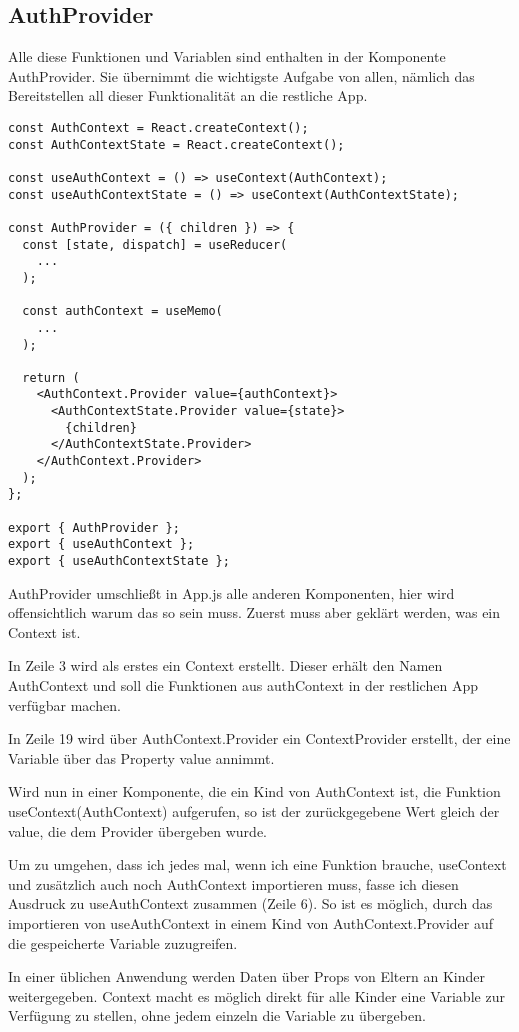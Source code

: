 \subsection{AuthProvider}
Alle diese Funktionen und Variablen sind enthalten in der Komponente AuthProvider. Sie übernimmt die
wichtigste Aufgabe von allen, nämlich das Bereitstellen all dieser Funktionalität an die restliche
App.

\begin{lstlisting}
const AuthContext = React.createContext();
const AuthContextState = React.createContext();

const useAuthContext = () => useContext(AuthContext);
const useAuthContextState = () => useContext(AuthContextState);

const AuthProvider = ({ children }) => {
  const [state, dispatch] = useReducer(
    ...
  );

  const authContext = useMemo(
    ...
  );

  return (
    <AuthContext.Provider value={authContext}>
      <AuthContextState.Provider value={state}>
        {children}
      </AuthContextState.Provider>
    </AuthContext.Provider>
  );
};

export { AuthProvider };
export { useAuthContext };
export { useAuthContextState };
\end{lstlisting}

AuthProvider umschließt in App.js alle anderen Komponenten, hier wird offensichtlich warum das so
sein muss. Zuerst muss aber geklärt werden, was ein Context ist.

In Zeile 3 wird als erstes ein Context erstellt. Dieser erhält den Namen AuthContext und soll die
Funktionen aus authContext in der restlichen App verfügbar machen.

In Zeile 19 wird über AuthContext.Provider ein ContextProvider erstellt, der eine Variable über das
Property value annimmt.

Wird nun in einer Komponente, die ein Kind von AuthContext ist, die Funktion useContext(AuthContext)
aufgerufen, so ist der zurückgegebene Wert gleich der value, die dem Provider übergeben wurde.

Um zu umgehen, dass ich jedes mal, wenn ich eine Funktion brauche, useContext und zusätzlich auch
noch AuthContext importieren muss, fasse ich diesen Ausdruck zu useAuthContext zusammen (Zeile 6).
So ist es möglich, durch das importieren von useAuthContext in einem Kind von AuthContext.Provider
auf die gespeicherte Variable zuzugreifen.

In einer üblichen Anwendung werden Daten über Props von Eltern an Kinder weitergegeben. Context
macht es möglich direkt für alle Kinder eine Variable zur Verfügung zu stellen, ohne jedem einzeln
die Variable zu übergeben.